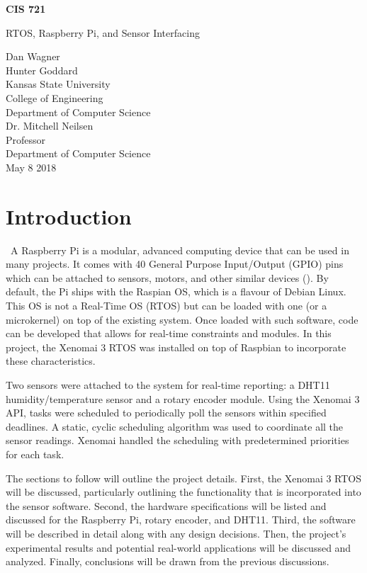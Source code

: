 \documentclass[letterpaper, 12pt]{article}
\begin{document}
	\begin{titlepage}
		\centering
		\vspace*{5.75cm}
		{\huge\bfseries CIS 721\par}
		{\large RTOS, Raspberry Pi, and Sensor Interfacing\par}
		\vspace{2cm}
		Dan Wagner\\
		Hunter Goddard\\
		Kansas State University\\
		College of Engineering\\
		Department of Computer Science\\
		\vspace{1cm}
		Dr. Mitchell Neilsen\\
		Professor\\
		Department of Computer Science\\
		\vspace{1cm}
		May 8 2018
	\end{titlepage}

\section{Introduction}

~\indent A Raspberry Pi is a modular, advanced computing device that can be used in many projects.  It comes with 40 General Purpose Input/Output (GPIO) pins which can be attached to sensors, motors, and other similar devices (\cite{raspberrypifoundation2018}).  By default, the Pi ships with the Raspian OS, which is a flavour of Debian Linux.  This OS is not a Real-Time OS (RTOS) but can be loaded with one (or a microkernel) on top of the existing system.  Once loaded with such software, code can be developed that allows for real-time constraints and modules.  In this project, the Xenomai 3 RTOS was installed on top of Raspbian to incorporate these characteristics.

\indent Two sensors were attached to the system for real-time reporting: a DHT11 humidity/temperature sensor and a rotary encoder module.  Using the Xenomai 3 API, tasks were scheduled to periodically poll the sensors within specified deadlines.  A static, cyclic scheduling algorithm was used to coordinate all the sensor readings.  Xenomai handled the scheduling with predetermined priorities for each task.

\indent The sections to follow will outline the project details.  First, the Xenomai 3 RTOS will be discussed, particularly outlining the functionality that is incorporated into the sensor software.  Second, the hardware specifications will be listed and discussed for the Raspberry Pi, rotary encoder, and DHT11.  Third, the software will be described in detail along with any design decisions.  Then, the project's experimental results and potential real-world applications will be discussed and analyzed.  Finally, conclusions will be drawn from the previous discussions.
\end{document}
